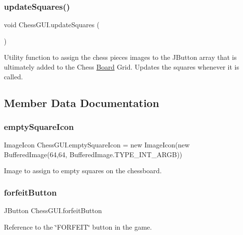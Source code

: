 \subsubsection{\texorpdfstring{update\+Squares()}{updateSquares()}}
{\footnotesize\ttfamily void Chess\+G\+U\+I.\+update\+Squares (\begin{DoxyParamCaption}{ }\end{DoxyParamCaption})}

Utility function to assign the chess pieces\textquotesingle{} images to the J\+Button array that is ultimately added to the Chess \mbox{\hyperlink{class_board}{Board}} Grid. Updates the squares whenever it is called. 

\subsection{Member Data Documentation}
\mbox{\label{class_chess_g_u_i_a950a91cc4c06f416fcd27990cda2023b}} 
\subsubsection{\texorpdfstring{empty\+Square\+Icon}{emptySquareIcon}}
{\footnotesize\ttfamily Image\+Icon Chess\+G\+U\+I.\+empty\+Square\+Icon = new Image\+Icon(new Buffered\+Image(64,64, Buffered\+Image.\+T\+Y\+P\+E\+\_\+\+I\+N\+T\+\_\+\+A\+R\+GB))\hspace{0.3cm}{\ttfamily [static]}}

Image to assign to empty squares on the chessboard. \mbox{\label{class_chess_g_u_i_a4ab3b8b5fa925942bb7abf75cf42094d}} 
\subsubsection{\texorpdfstring{forfeit\+Button}{forfeitButton}}
{\footnotesize\ttfamily J\+Button Chess\+G\+U\+I.\+forfeit\+Button\hspace{0.3cm}{\ttfamily [protected]}}

Reference to the \char`\"{}\+F\+O\+R\+F\+E\+I\+T\char`\"{} button in the game. \mbox{\label{class_chess_g_u_i_ae3a5127a34ad9aaac6b4779f9e70968c}} 

